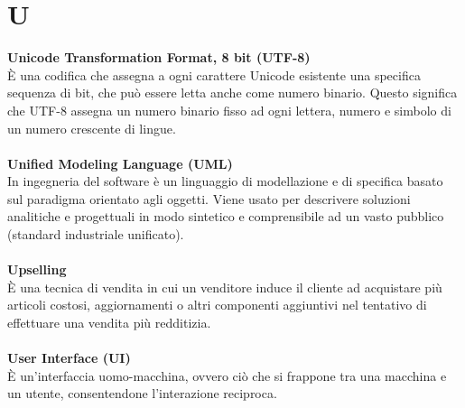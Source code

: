 \section{U}
\textbf{Unicode Transformation Format, 8 bit (UTF-8)}\\
È una codifica che assegna a ogni carattere Unicode esistente una specifica sequenza di bit, che può essere letta anche come numero binario. Questo significa che UTF-8 assegna un numero binario fisso ad ogni lettera, numero e simbolo di un numero crescente di lingue. \\ \\
\textbf{Unified Modeling Language (UML)}\\
In ingegneria del software è un linguaggio di modellazione e di specifica basato sul paradigma orientato agli oggetti. Viene usato per descrivere soluzioni analitiche e progettuali in modo sintetico e comprensibile ad un vasto pubblico (standard industriale unificato). \\ \\
\textbf{Upselling}\\
È una tecnica di vendita in cui un venditore induce il cliente ad acquistare più articoli costosi, aggiornamenti o altri componenti aggiuntivi nel tentativo di effettuare una vendita più redditizia. \\ \\
\textbf{User Interface (UI)}\\
È un'interfaccia uomo-macchina, ovvero ciò che si frappone tra una macchina e un utente, consentendone l'interazione reciproca. \\ \\
\clearpage